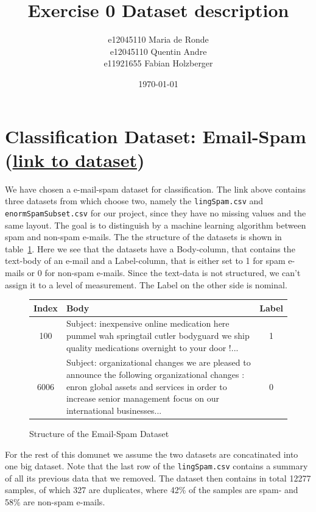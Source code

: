 \documentclass[11pt]{article}
\title{Exercise 0 Dataset description}
\author{e12045110 Maria de Ronde \\ e12045110  Quentin Andre  \\ e11921655 Fabian Holzberger}
\date{\today}
\begin{document}
\graphicspath{{./figures/}}
\maketitle

\newpage
%
\section{Classification Dataset: Email-Spam (\href{https://www.kaggle.com/nitishabharathi/email-spam-dataset?select=enronSpamSubset.csv}{link to dataset})}
We have chosen a e-mail-spam dataset for classification. The link above contains three datasets from which choose two, namely the \texttt{lingSpam.csv} and \texttt{enormSpamSubset.csv} for our project, since they have no missing values and the same layout.  The goal is to distinguish by a machine learning algorithm between spam and non-spam e-mails. The the structure of the datasets is shown in table~\ref{tab::0}. Here we see that the datasets have a Body-column, that contains the text-body of an e-mail and a Label-column, that is either set to 1 for spam e-mails or 0 for non-spam e-mails. Since the text-data is not structured, we can't assign it to a level of measurement. The Label on the other side is nominal.   
%
\begin{figure}[h]
  \begin{tabular}{ | c | p{15cm} | c |}
    \hline
    Index & Body & Label \\
    \hline
    100 & 
    Subject: inexpensive online medication here
 pummel wah springtail cutler bodyguard
 we ship quality medications overnight to your door !...
    & 1 \\ \hline
    6006
    &
    Subject: organizational changes
 we are pleased to announce the following organizational changes :
 enron global assets and services
 in order to increase senior management focus on our international businesses... 
    & 0 \\
    \hline
    \end{tabular}
    \caption{Structure of the Email-Spam Dataset}
    \label{tab::0}
  \end{figure}
%
For the rest of this domunet we assume the two datasets are concatinated into one big dataset. Note that the last row of the \texttt{lingSpam.csv} contains a summary of all its previous data that we removed. The dataset then contains in total 12277 samples, of which 327 are duplicates, where 42\% of the samples are spam- and 58\% are non-spam e-mails. %
\end{document}
